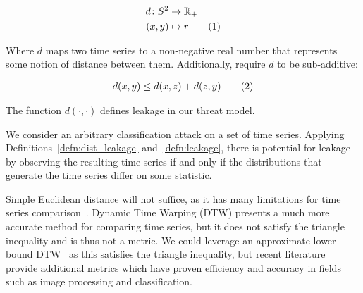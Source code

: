 \documentclass[a4paper]{article}
\newcommand\numberthis{\addtocounter{equation}{1}\tag{\theequation}}
\begin{document}
\begin{align*}
    d \colon S^2 &\to \mathbb{R}_{+}\\
    (x,y) &\mapsto r \numberthis
\end{align*}

Where $d$ maps two time series to a non-negative real number that represents some notion of distance between them.
Additionally, require $d$ to be sub-additive:

\begin{align*}
    d(x,y) \le d(x,z) + d(z,y) \numberthis
\end{align*}


The function $d(\cdot,\cdot)$ defines leakage in our threat model.

We consider an arbitrary classification attack on a set of time series.
Applying Definitions~\ref{defn:dist_leakage} and~\ref{defn:leakage}, there is potential for leakage by observing the resulting time series if and only if the distributions that generate the time series differ on some statistic.



% 


Simple Euclidean distance will not suffice, as it has many limitations for time series comparison~\cite{weighted-dtw}.
Dynamic Time Warping (DTW) presents a much more accurate method for comparing time series, but it does not satisfy the triangle inequality and is thus not a metric.
We could leverage an approximate lower-bound DTW~\cite{Lemire09-DTW} as this satisfies the triangle inequality, but recent literature~\cite{Kulis12-KLSH,Jiang15-KLSH,Kim16-SLSH} provide additional metrics which have proven efficiency and accuracy in fields such as image processing and classification.



\iffalse{}
\end{document}
